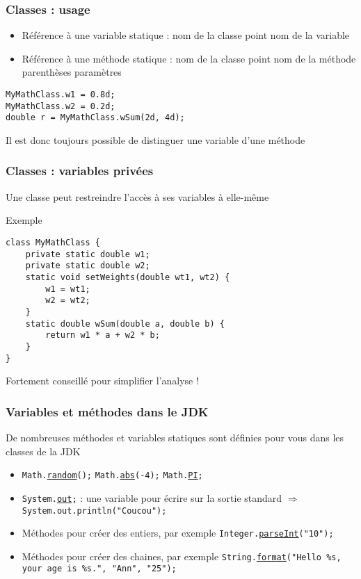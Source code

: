 \documentclass[english, french]{beamer}
\begin{document}
\begin{frame}[fragile]
	\frametitle{Classes : usage}
	\begin{itemize}
		\item Référence à une variable statique : nom de la classe point nom de la variable
		\item Référence à une méthode statique : nom de la classe point nom de la méthode parenthèses paramètres
	\end{itemize}
	\begin{lstlisting}
MyMathClass.w1 = 0.8d;
MyMathClass.w2 = 0.2d;
double r = MyMathClass.wSum(2d, 4d);
	\end{lstlisting}
	Il est donc toujours possible de distinguer une variable d’une méthode
\end{frame}
	
\begin{frame}[fragile]
	\frametitle{Classes : variables privées}
	Une classe peut restreindre l’accès à ses variables à elle-même
	\begin{block}{Exemple}
		\begin{lstlisting}
class MyMathClass {
	private static double w1;
	private static double w2;
	static void setWeights(double wt1, wt2) {
		w1 = wt1;
		w2 = wt2;
	}
	static double wSum(double a, double b) {
		return w1 * a + w2 * b;
	}
}
		\end{lstlisting}	
	\end{block}
	Fortement conseillé pour simplifier l’analyse !
\end{frame}

\begin{frame}
	\frametitle{Variables et méthodes dans le JDK}
	De nombreuses méthodes et variables statiques sont définies pour vous dans les classes de la JDK
	\begin{itemize}
		\item \texttt{Math.\href{https://docs.oracle.com/en/java/javase/11/docs/api/java.base/java/lang/Math.html\#random()}{random}();}
			\texttt{Math.\href{https://docs.oracle.com/en/java/javase/11/docs/api/java.base/java/lang/Math.html\#abs(double)}{abs}(-4);}
			\texttt{Math.\href{https://docs.oracle.com/en/java/javase/11/docs/api/java.base/java/lang/Math.html\#PI}{PI};}
		\item \texttt{System.\href{https://docs.oracle.com/en/java/javase/11/docs/api/java.base/java/lang/System.html\#out}{out};} : une variable pour écrire sur la sortie standard $⇒$ \texttt{System.out.println("Coucou");}
		\item Méthodes pour créer des entiers, par exemple \texttt{Integer.\href{https://docs.oracle.com/en/java/javase/11/docs/api/java.base/java/lang/Integer.html\#parseInt(java.lang.String)}{parseInt}("10");}
		\item Méthodes pour créer des chaines, par exemple \texttt{String.\href{https://docs.oracle.com/en/java/javase/11/docs/api/java.base/java/lang/String.html\#format(java.lang.String,java.lang.Object...)}{format}("Hello \%s, your age is \%s.", "Ann", "25");}
	\end{itemize}
\end{frame}
\end{document}

